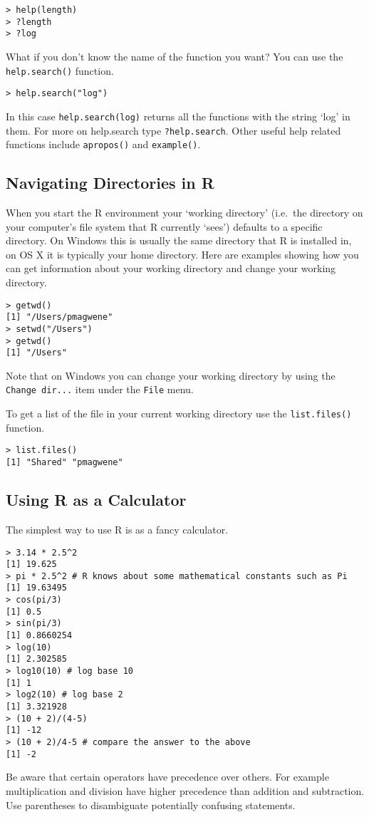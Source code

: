\begin{lstlisting}
> help(length)
> ?length 
> ?log
\end{lstlisting}
What if you don't know the name of the function you want? You can use
the \lstinline!help.search()! function.

\begin{lstlisting}
> help.search("log")
\end{lstlisting}
In this case \lstinline!help.search(log)! returns all the functions with
the string `log' in them. For more on help.search type
\lstinline!?help.search!. Other useful help related functions include
\lstinline!apropos()! and \lstinline!example()!.

\subsection{Navigating Directories in R}

When you start the R environment your `working directory' (i.e.~the
directory on your computer's file system that R currently `sees')
defaults to a specific directory. On Windows this is usually the same
directory that R is installed in, on OS X it is typically your home
directory. Here are examples showing how you can get information about
your working directory and change your working directory.

\begin{lstlisting}
> getwd() 
[1] "/Users/pmagwene"
> setwd("/Users") 
> getwd() 
[1] "/Users"
\end{lstlisting}
Note that on Windows you can change your working directory by using the
\lstinline!Change dir...! item under the \lstinline!File! menu.

To get a list of the file in your current working directory use the
\lstinline!list.files()! function.

\begin{lstlisting}
> list.files() 
[1] "Shared" "pmagwene"
\end{lstlisting}
\subsection{Using R as a Calculator}

The simplest way to use R is as a fancy calculator.

\begin{lstlisting}
> 3.14 * 2.5^2
[1] 19.625
> pi * 2.5^2 # R knows about some mathematical constants such as Pi 
[1] 19.63495
> cos(pi/3)
[1] 0.5
> sin(pi/3)
[1] 0.8660254
> log(10)
[1] 2.302585
> log10(10) # log base 10
[1] 1
> log2(10) # log base 2
[1] 3.321928
> (10 + 2)/(4-5)
[1] -12
> (10 + 2)/4-5 # compare the answer to the above
[1] -2
\end{lstlisting}
Be aware that certain operators have precedence over others. For example
multiplication and division have higher precedence than addition and
subtraction. Use parentheses to disambiguate potentially confusing
statements.

